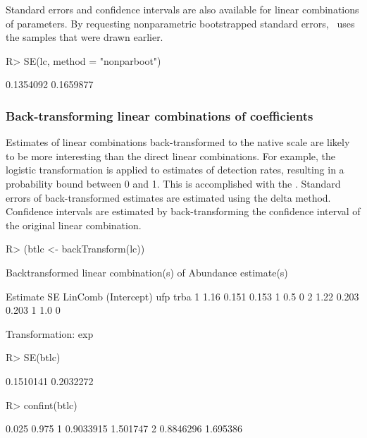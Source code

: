 \documentclass[article,shortnames]{jss}
\newcommand{\um}{\pkg{unmarked}}
\begin{document}
{Standard errors and confidence intervals are also available for linear
combinations of parameters.  By requesting nonparametric bootstrapped
standard errors, \um\ uses the samples that were drawn earlier.

\begin{Schunk}
\begin{Sinput}
R> SE(lc, method = "nonparboot")
\end{Sinput}
\begin{Soutput}
[1] 0.1354092 0.1659877
\end{Soutput}
\end{Schunk}

\subsubsection{Back-transforming linear combinations of coefficients}

Estimates of linear combinations back-transformed to the native scale
are likely to be more interesting than the direct linear combinations.
For example, the logistic transformation is applied to estimates of
detection rates, resulting in a probability bound between 0 and
1. This is accomplished with the .  Standard
errors of back-transformed estimates are estimated using the delta
method.  Confidence intervals are estimated by back-transforming the
confidence interval of the original linear combination.

\begin{Schunk}
\begin{Sinput}
R> (btlc <- backTransform(lc))
\end{Sinput}
\begin{Soutput}
Backtransformed linear combination(s) of Abundance estimate(s)

  Estimate    SE LinComb (Intercept) ufp trba
1     1.16 0.151   0.153           1 0.5    0
2     1.22 0.203   0.203           1 1.0    0

Transformation: exp 
\end{Soutput}
\begin{Sinput}
R> SE(btlc)
\end{Sinput}
\begin{Soutput}
[1] 0.1510141 0.2032272
\end{Soutput}
\begin{Sinput}
R> confint(btlc)
\end{Sinput}
\begin{Soutput}
      0.025    0.975
1 0.9033915 1.501747
2 0.8846296 1.695386
\end{Soutput}
\end{Schunk}

}
\end{document}
